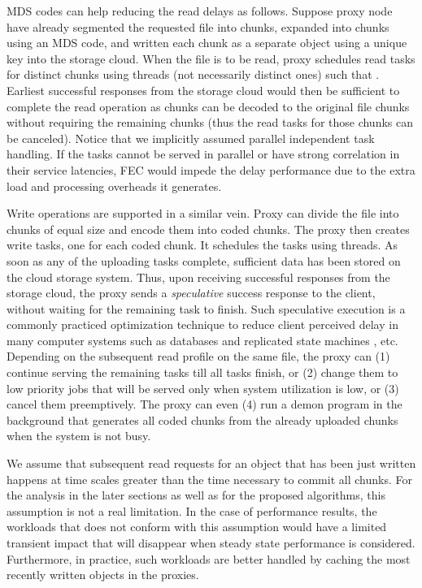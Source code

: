 \documentclass[journal]{IEEEtran}
\begin{document}
MDS codes can help reducing the read delays as follows. Suppose proxy node have already segmented the requested file into  chunks, expanded into  chunks using an  MDS code, and written each chunk as a separate object using a unique key into the storage cloud.
When the file is to be read, proxy schedules   read tasks for distinct chunks using  threads (not necessarily distinct ones) such that .  Earliest  successful responses from the storage cloud would then be sufficient to complete the read operation as  chunks can be decoded to the original file chunks without requiring the remaining chunks (thus the read tasks for those chunks can be canceled). Notice that we implicitly assumed parallel independent task handling. If the tasks cannot be served in parallel or have strong correlation in their service latencies, FEC would impede the delay performance due to the extra load and processing overheads it generates.


Write operations are supported in a similar vein. Proxy can divide the file into  chunks of equal size and encode them into  coded chunks. The proxy then creates  write tasks, one for each coded chunk. It schedules the tasks using  threads. As soon as any  of the  uploading tasks complete, sufficient data has been stored on the cloud storage system.  
Thus, upon receiving  successful responses from the storage cloud, the proxy sends a {\em speculative} success response to the client, without waiting for the remaining  task to finish.
Such speculative execution is a commonly practiced optimization technique to reduce client perceived delay in many computer systems such as databases and replicated state machines \cite{zyzzyva}, etc.
Depending on the subsequent read profile on the same file, the proxy can (1) continue serving the remaining tasks till all  tasks finish, or (2) change them to low priority jobs that will be served only when system utilization is low, or (3) cancel them preemptively. The proxy can even (4) run a demon program in the background that generates all  coded chunks from the already uploaded chunks when the system is not busy.

We assume that subsequent read requests for an object that has been just written happens at time scales greater than the time necessary to commit all  chunks. For the analysis in the later sections as well as for the proposed algorithms, this assumption is not a real limitation. In the case of performance results, the workloads that does not conform with this assumption would have a limited transient impact that will disappear when steady state performance is considered. Furthermore, in practice, such workloads are better handled by caching the most recently written objects in the proxies.
\end{document}
